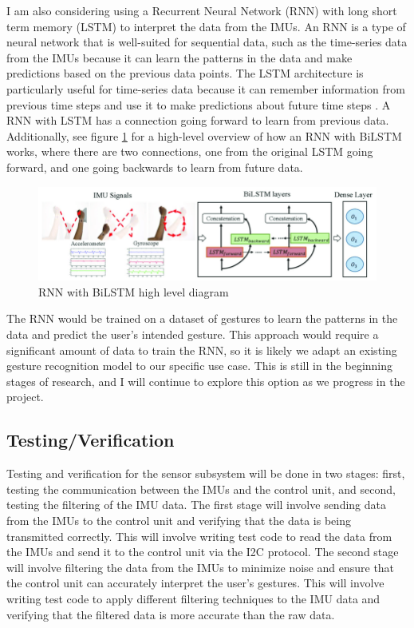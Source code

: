 \documentclass[12pt]{article}
\begin{document}
I am also considering using a Recurrent Neural Network (RNN) with long short term memory (LSTM) to interpret the data from the IMUs. An RNN is a type of neural network that is well-suited for sequential data, such as the time-series data from the IMUs because it can learn the patterns in the data and make predictions based on the previous data points. The LSTM architecture is particularly useful for time-series data because it can remember information from previous time steps and use it to make predictions about future time steps \cite{IBM_RNN}. A RNN with LSTM has a connection going forward to learn from previous data.
Additionally, see figure \ref{fig:RNN} for a high-level overview of how an RNN with BiLSTM works, where there are two connections, one from the original LSTM going forward, and one going backwards to learn from future data. 

\begin{figure}[ht]
    \centering
    \includegraphics[width=1.0\textwidth]{images/RNN_BiLSTM.png}
    \caption{RNN with BiLSTM high level diagram \cite{ValarezoAnazco2021}}
    \label{fig:RNN}
\end{figure}

The RNN would be trained on a dataset of gestures to learn the patterns in the data and predict the user's intended gesture. This approach would require a significant amount of data to train the RNN, so it is likely we adapt an existing gesture recognition model to our specific use case. This is still in the beginning stages of research, and I will continue to explore this option as we progress in the project.
\subsection{Testing/Verification}
Testing and verification for the sensor subsystem will be done in two stages: first, testing the communication between the IMUs and the control unit, and second, testing the filtering of the IMU data. The first stage will involve sending data from the IMUs to the control unit and verifying that the data is being transmitted correctly. This will involve writing test code to read the data from the IMUs and send it to the control unit via the I2C protocol. The second stage will involve filtering the data from the IMUs to minimize noise and ensure that the control unit can accurately interpret the user's gestures. This will involve writing test code to apply different filtering techniques to the IMU data and verifying that the filtered data is more accurate than the raw data.
\end{document}
